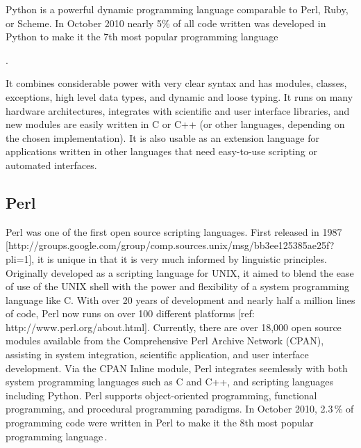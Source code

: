 \documentclass[10pt]{article}
\begin{document}
Python is a powerful dynamic programming language comparable to Perl,
Ruby, or Scheme. In October 2010 nearly 5\% of all code written was
developed in Python to make it the 7th most popular programming
language\,\cite{software09:_tiobe_progr_commun_index} 

.

It combines considerable power with very clear syntax and has modules, classes,
exceptions, high level data types, and dynamic
and loose typing. It runs on many hardware architectures, integrates
with scientific and user interface libraries, and new modules are
easily written in C or C++ (or other languages, depending on the
chosen implementation). It is also usable as an extension language for
applications written in other languages that need easy-to-use
scripting or automated interfaces.


\subsection*{Perl}

Perl was one of the first open source scripting languages. First
released in 1987
[http://groups.google.com/group/comp.sources.unix/msg/bb3ee125385ae25f?pli=1],
it is unique in that it is very much informed by linguistic
principles.  Originally developed as a scripting language for UNIX, it
aimed to blend the ease of use of the UNIX shell with the power and
flexibility of a system programming language like C.  With over 20
years of development and nearly half a million lines of code, Perl now
runs on over 100 different platforms [ref:
http://www.perl.org/about.html].  Currently, there are over 18,000
open source modules available from the Comprehensive Perl Archive
Network (CPAN), assisting in system integration, scientific
application, and user interface development.  Via the CPAN Inline
module, Perl integrates seemlessly with both system programming
languages such as C and C++, and scripting languages including Python.
Perl supports object-oriented programming, functional programming, and
procedural programming paradigms. In October 2010,
2.3\,\% of programming code were written in Perl to make
it the 8th most popular programming
language\,\cite{software09:_tiobe_progr_commun_index}.
\end{document}
